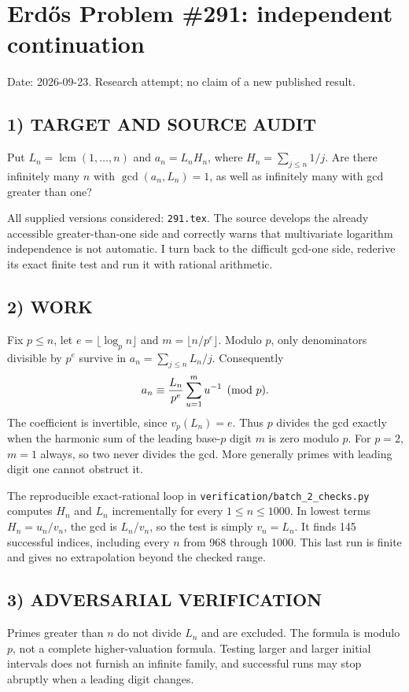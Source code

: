 \section{Erd\H{o}s Problem \#291: independent continuation}
\noindent Date: 2026-09-23. Research attempt; no claim of a new published result.
\subsection{1) TARGET AND SOURCE AUDIT}
Put $L_n=\operatorname{lcm}(1,\ldots,n)$ and $a_n=L_nH_n$, where $H_n=\sum_{j\le n}1/j$. Are there infinitely many $n$ with $\gcd(a_n,L_n)=1$, as well as infinitely many with gcd greater than one?

All supplied versions considered: \texttt{291.tex}.
The source develops the already accessible greater-than-one side and correctly warns that multivariate logarithm independence is not automatic. I turn back to the difficult gcd-one side, rederive its exact finite test and run it with rational arithmetic.
\subsection{2) WORK}
Fix $p\le n$, let $e=\lfloor\log_p n\rfloor$ and $m=\lfloor n/p^e\rfloor$. Modulo $p$, only denominators divisible by $p^e$ survive in $a_n=\sum_{j\le n}L_n/j$. Consequently
\[
a_n\equiv {L_n\over p^e}\sum_{u=1}^{m}u^{-1}\pmod p.
\]
The coefficient is invertible, since $v_p(L_n)=e$. Thus $p$ divides the gcd exactly when the harmonic sum of the leading base-$p$ digit $m$ is zero modulo $p$. For $p=2$, $m=1$ always, so two never divides the gcd. More generally primes with leading digit one cannot obstruct it.

The reproducible exact-rational loop in \texttt{verification/batch\_2\_checks.py} computes $H_n$ and $L_n$ incrementally for every $1\le n\le1000$. In lowest terms $H_n=u_n/v_n$, the gcd is $L_n/v_n$, so the test is simply $v_n=L_n$. It finds 145 successful indices, including every $n$ from 968 through 1000. This last run is finite and gives no extrapolation beyond the checked range.
\subsection{3) ADVERSARIAL VERIFICATION}
Primes greater than $n$ do not divide $L_n$ and are excluded. The formula is modulo $p$, not a complete higher-valuation formula. Testing larger and larger initial intervals does not furnish an infinite family, and successful runs may stop abruptly when a leading digit changes.
